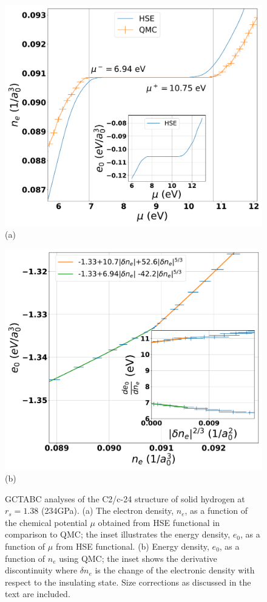 \begin{figure}
\begin{minipage}[b]{0.49\columnwidth}
\includegraphics[width=\columnwidth]{DFT_RQMC_C2CP250dVs}
(a) 
\end{minipage}
\begin{minipage}[b]{0.49\columnwidth}
\includegraphics[width=\columnwidth]{RQMC_C2CP250dVs}
(b) 
\end{minipage}
\caption{GCTABC analyses of the C2/c-24 structure of solid hydrogen at $r_s=1.38$ (234GPa). (a) 
The electron density, $n_e$, as a function of the chemical potential $\mu$ obtained from HSE functional
in comparison to QMC; the inset illustrates the energy density, $e_0$, as a function of $\mu$ from HSE functional.
(b) Energy density, $e_0$, as a function of $n_e$ using QMC; the inset shows the derivative discontinuity where $\delta n_e$ is the change of the electronic density with respect to the insulating state.
Size corrections as discussed in the text are included.
 \label{fig:H_C2CP250}}
\end{figure}

